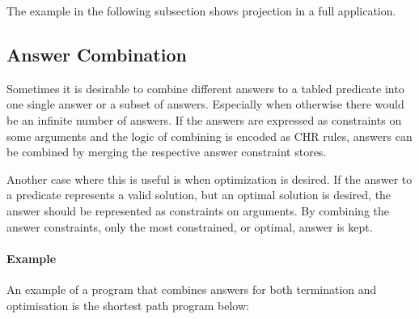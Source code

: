 The example in the following subsection shows projection in a full application.

\subsection{Answer Combination}

Sometimes it is desirable to combine different answers to a tabled predicate
into one single answer or a subset of answers. Especially when otherwise
there would be an infinite number of answers. If the answers are expressed as
constraints on some arguments and the logic of combining is encoded as CHR
rules, answers can be combined by merging the respective answer constraint
stores.

Another case where this is useful is when optimization is desired. If the
answer to a predicate represents a valid solution, but an optimal solution
is desired, the answer should be represented as constraints on arguments.
By combining the answer constraints, only the most constrained, or optimal,
answer is kept.

\paragraph{Example} 
An example of a program that combines answers for
both termination and optimisation is the shortest path program below:

